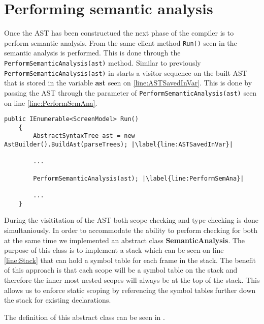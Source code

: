 \section{Performing semantic analysis}

Once the AST has been constructued the next phase of the compiler is to perform semantic analysis. From the same client method \texttt{Run()} seen in  the semantic analysis is performed. This is done through the \texttt{PerformSemanticAnalysis(ast)} method. 
Similar to previously \texttt{PerformSemanticAnalysis(ast)} in  starts a visitor sequence on the built AST that is stored in the variable \textbf{ast} seen on \ref{line:ASTSavedInVar}. This is done by passing the AST through the parameter of \texttt{PerformSemanticAnalysis(ast)} seen on line \ref{line:PerformSemAna}.

\begin{lstlisting}[caption={The Run method that serves as a client inside the DazelCompiler class}, label={lst:RunMethodSecond},escapechar=|]
    public IEnumerable<ScreenModel> Run()
    {
        AbstractSyntaxTree ast = new AstBuilder().BuildAst(parseTrees); |\label{line:ASTSavedInVar}|

        ...
        
        PerformSemanticAnalysis(ast); |\label{line:PerformSemAna}|

        ...
    }
\end{lstlisting}

During the visititation of the AST both scope checking and type checking is done simultaniously. 
In order to accommodate the ability to perform checking for both at the same time we implemented an abstract class \textbf{SemanticAnalysis}. The purpose of this class is to implement a stack which can be seen on line \ref{line:Stack} that can hold a symbol table for each frame in the stack. The benefit of this approach is that each scope will be a symbol table on the stack and therefore the inner most nested scopes will always be at the top of the stack. This allows us to enforce static scoping by referencing the symbol tables further down the stack for existing declarations.

The definition of this abstract class can be seen in .

